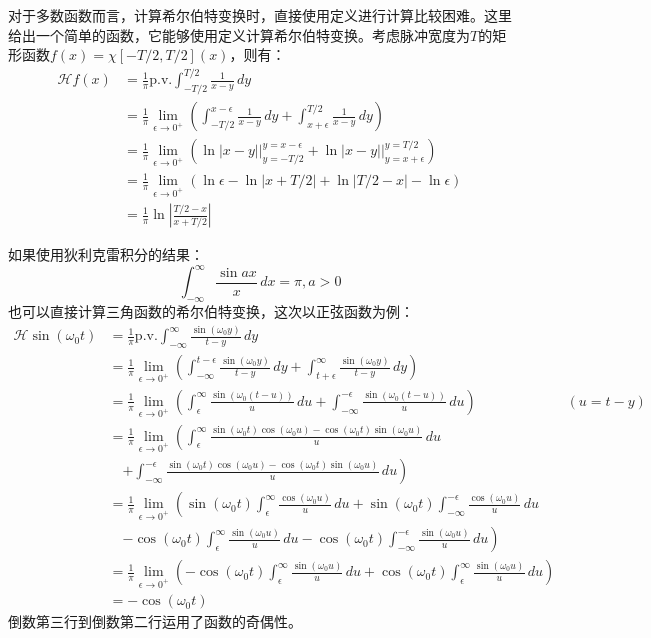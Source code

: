 \begin{example}[直接计算希尔伯特变换]
    对于多数函数而言，计算希尔伯特变换时，直接使用定义进行计算比较困难。这里给出一个简单的函数，它能够使用定义计算希尔伯特变换。考虑脉冲宽度为$T$的矩形函数$f(x)=\chi[-T/2,T/2](x)$，则有：
    \begin{align*}
        \mathcal{H} f(x)&=\frac{1}{\pi}\text{p.v.}\int_{-T/2}^{T/2}\frac{1}{x-y}\,dy\\
        &=\frac{1}{\pi}\lim_{\epsilon\to 0^+}\left(\int_{-T/2}^{x-\epsilon}\frac{1}{x-y}\,dy+\int_{x+\epsilon}^{T/2}\frac{1}{x-y}\,dy\right)\\
        &=\frac{1}{\pi}\lim_{\epsilon\to 0^+}\left(\ln|x-y|\Big|_{y=-T/2}^{y=x-\epsilon}+\ln|x-y|\Big|_{y=x+\epsilon}^{y=T/2}\right)\\
        &=\frac{1}{\pi}\lim_{\epsilon\to 0^+}\left(\ln \epsilon -\ln|x+T/2|+\ln|T/2 -x|-\ln \epsilon \right)\\
        &=\frac{1}{\pi}\ln\left|\frac{T/2 -x}{x+T/2}\right|
    \end{align*}
\end{example}

\begin{example}
    如果使用狄利克雷积分的结果：
    \[\int_{-\infty}^{\infty}\frac{\sin ax}{x}\,dx=\pi,a>0\]
    也可以直接计算三角函数的希尔伯特变换，这次以正弦函数为例：
    \begin{align*}
        \mathcal{H} \sin(\omega_0 t)&=\frac{1}{\pi}\text{p.v.}\int_{-\infty}^{\infty}\frac{\sin(\omega_0 y)}{t-y}\,dy\\
        &=\frac{1}{\pi}\lim_{\epsilon\to 0^+}\left(\int_{-\infty}^{t-\epsilon}\frac{\sin(\omega_0 y)}{t-y}\,dy+\int_{t+\epsilon}^{\infty}\frac{\sin(\omega_0 y)}{t-y}\,dy\right)\\
        &=\frac{1}{\pi}\lim_{\epsilon\to 0^+}\left(\int_{\epsilon}^{\infty}\frac{\sin(\omega_0 (t-u))}{u}\,du+\int_{-\infty}^{-\epsilon}\frac{\sin(\omega_0 (t-u))}{u}\,du\right)& (u=t-y)\\
        &=\frac{1}{\pi}\lim_{\epsilon\to 0^+}\left(\int_{\epsilon}^{\infty}\frac{\sin(\omega_0 t)\cos(\omega_0 u)-\cos(\omega_0 t)\sin(\omega_0 u)}{u}\,du\right.\\
        &\quad \left.+\int_{-\infty}^{-\epsilon}\frac{\sin(\omega_0 t)\cos(\omega_0 u)-\cos(\omega_0 t)\sin(\omega_0 u)}{u}\,du\right)\\
        &=\frac{1}{\pi}\lim_{\epsilon\to 0^+}\left(\sin(\omega_0 t)\int_{\epsilon}^{\infty}\frac{\cos(\omega_0 u)}{u}\,du+\sin(\omega_0 t)\int_{-\infty}^{-\epsilon}\frac{\cos(\omega_0 u)}{u}\,du\right.\\
        &\quad \left.-\cos(\omega_0 t)\int_{\epsilon}^{\infty}\frac{\sin(\omega_0 u)}{u}\,du-\cos(\omega_0 t)\int_{-\infty}^{-\epsilon}\frac{\sin(\omega_0 u)}{u}\,du\right)\\
        &=\frac{1}{\pi}\lim_{\epsilon\to 0^+}\left(-\cos(\omega_0 t)\int_{\epsilon}^{\infty}\frac{\sin(\omega_0 u)}{u}\,du+\cos(\omega_0 t)\int_{\epsilon}^{\infty}\frac{\sin(\omega_0 u)}{u}\,du\right)\\
        &=-\cos(\omega_0 t)
    \end{align*}
    倒数第三行到倒数第二行运用了函数的奇偶性。
\end{example}

